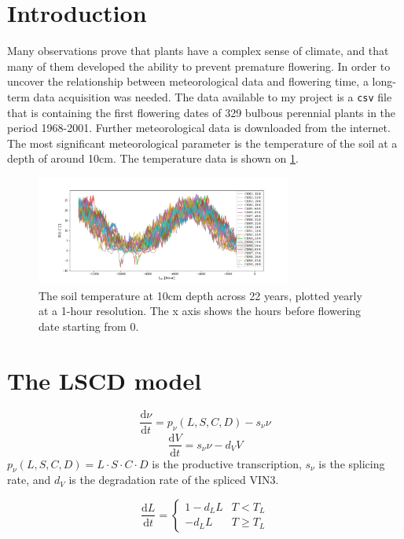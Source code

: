 \documentclass[11pt, a4paper]{article}
\begin{document}
\section*{Introduction}
\par Many observations prove that plants have a complex sense of climate, and that many of them developed the ability
to prevent premature flowering.
In order to uncover the relationship between meteorological data and flowering time, a long-term data acquisition was needed.
The data available to my project is a \texttt{csv} file that is containing the first flowering dates of 329 bulbous perennial plants 
in the period 1968-2001. Further meteorological data is downloaded from the internet. The most significant meteorological parameter 
is the temperature of the soil at a depth of around 10cm. The temperature data is shown on \ref{fig:tempdata}.
\begin{figure}[H]
    \centering
    \includegraphics[width=0.75\textwidth]{images/temp_plot.png}
    \caption{The soil temperature at 10cm depth across 22 years, plotted yearly at a 1-hour resolution.
    The x axis shows the hours before flowering date starting from 0.}
    \label{fig:tempdata}
\end{figure}

\section*{The LSCD model}

\begin{equation}
    \frac{\mathrm d\nu}{\mathrm d t} = p_{\nu}(L, S, C, D) - s_{\nu}\nu
\end{equation}
\begin{equation}
    \frac{\mathrm dV}{\mathrm dt} = s_{\nu}\nu - d_VV
\end{equation}
$p_{\nu}(L, S, C, D)=L\cdot S\cdot C\cdot D$ is the productive transcription,
$s_{\nu}$ is the splicing rate, and $d_V$ is the degradation rate of the spliced VIN3.

\begin{equation}
    \frac{\mathrm dL}{\mathrm dt} =
    \begin{cases}
    1-d_LL & T < T_L \\
    -d_LL & T \geq T_L
    \end{cases}
\end{equation}
\end{document}
